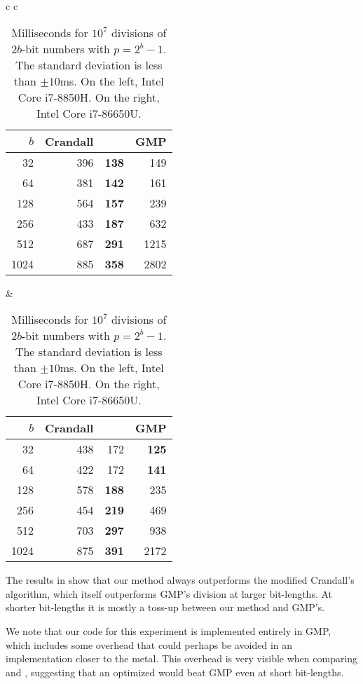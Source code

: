 \begin{table}[H]
   \centering
   \begin{tabular}{ c c }
      \begin{tabular}{ r | r r r }
         $b$ & Crandall & \Cref{alg:division-generalized} & GMP \\
         \hline
         32 & 396 & \textbf   {138}  & 149\\
         64 & 381 &   \textbf {142}  & 161\\
         128 & 564 &  \textbf {157}  & 239\\
         256 & 433 &  \textbf {187}  & 632\\
         512 & 687 &  \textbf {291}  & 1215\\
         1024 & 885 & \textbf {358}  & 2802
      \end{tabular}
      \hspace{.5em}
      &
      \hspace{.5em}
      \begin{tabular}{ r | r r r }
         $b$ & Crandall & \Cref{alg:division-generalized} & GMP \\
         \hline
         32 & 438 & 172 & \textbf{125}\\
         64 & 422 & 172 & \textbf{141}\\
         128 & 578 &      \textbf{188} & 235\\
         256 & 454 &      \textbf{219} & 469\\
         512 & 703 &      \textbf{297} & 938\\
         1024 & 875 &     \textbf{391} & 2172
      \end{tabular}
   \end{tabular}
   \caption{Milliseconds for $10^7$ divisions of $2b$-bit numbers with $p=2^b-1$.
      The standard deviation is less than $\pm10$ms.
         On the left, Intel Core i7-8850H.
         On the right, Intel Core i7-86650U.
   }
   \label{tab:division-experiments}
\end{table}

The results in  show that our method always outperforms the modified Crandall's algorithm, which itself outperforms GMP's division at larger bit-lengths.
At shorter bit-lengths it is mostly a toss-up between our method and GMP's.

We note that our code for this experiment is implemented entirely in GMP, which includes some overhead that could perhaps be avoided in an implementation closer to the metal.
This overhead is very visible when comparing  and , suggesting that an optimized  would beat GMP even at short bit-lengths.

